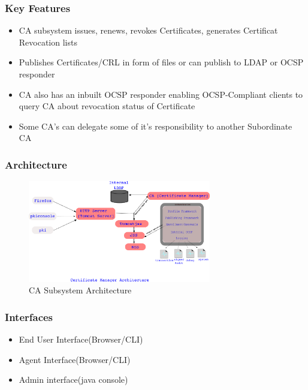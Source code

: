 \documentclass[a4paper]{article}
\begin{document}
\subsubsection{Key Features}
    \begin{itemize}
        \item CA subsystem issues, renews, revokes Certificates, generates Certificat Revocation lists
        \item Publishes Certificates/CRL in form of files or can publish to LDAP or OCSP responder
        \item CA also has an inbuilt OCSP responder enabling OCSP-Compliant clients to query CA about revocation status of Certificate
        \item Some CA's can delegate some of it's responsibility to another Subordinate CA
    \end{itemize}
\subsubsection{Architecture}
     \begin{figure}[H]
          \centering
          \includegraphics[width=80mm]{CA-subsystem-Arch3.png}
          \caption{CA Subsystem Architecture}
    \end{figure}
\subsubsection{Interfaces}
    \begin{itemize}
        \item End User Interface(Browser/CLI)
        \item Agent Interface(Browser/CLI)
        \item Admin interface(java console)
    \end{itemize}
\end{document}
